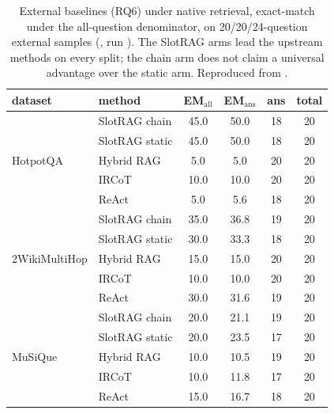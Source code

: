 \begin{table}[t]
\centering
\caption{External baselines (RQ6) under native retrieval, exact-match under
the all-question denominator, on 20/20/24-question external samples
(, run ). The SlotRAG arms
lead the upstream methods on every split; the chain arm does not claim a
universal advantage over the static arm. Reproduced from
.}
\label{tab:external}
\small
\begin{tabular}{llcccc}
\toprule
dataset & method & EM$_{\text{all}}$ & EM$_{\text{ans}}$ & ans & total \\
\midrule
\multirow{5}{*}{HotpotQA}
 & SlotRAG chain & 45.0 & 50.0 & 18 & 20 \\
 & SlotRAG static & 45.0 & 50.0 & 18 & 20 \\
 & Hybrid RAG & 5.0 & 5.0 & 20 & 20 \\
 & IRCoT & 10.0 & 10.0 & 20 & 20 \\
 & ReAct & 5.0 & 5.6 & 18 & 20 \\
\midrule
\multirow{5}{*}{2WikiMultiHop}
 & SlotRAG chain & 35.0 & 36.8 & 19 & 20 \\
 & SlotRAG static & 30.0 & 33.3 & 18 & 20 \\
 & Hybrid RAG & 15.0 & 15.0 & 20 & 20 \\
 & IRCoT & 10.0 & 10.0 & 20 & 20 \\
 & ReAct & 30.0 & 31.6 & 19 & 20 \\
\midrule
\multirow{5}{*}{MuSiQue}
 & SlotRAG chain & 20.0 & 21.1 & 19 & 20 \\
 & SlotRAG static & 20.0 & 23.5 & 17 & 20 \\
 & Hybrid RAG & 10.0 & 10.5 & 19 & 20 \\
 & IRCoT & 10.0 & 11.8 & 17 & 20 \\
 & ReAct & 15.0 & 16.7 & 18 & 20 \\
\bottomrule
\end{tabular}
\end{table}

